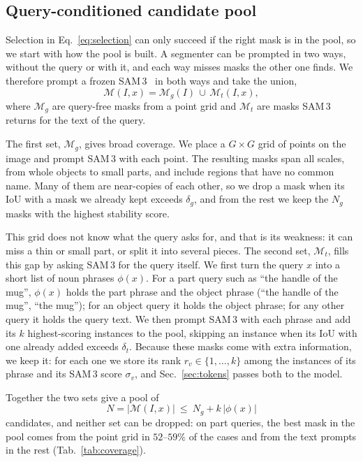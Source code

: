 \subsection{Query-conditioned candidate pool}
\label{sec:pool}

Selection in Eq.~\eqref{eq:selection} can only succeed if the right mask is in the pool, so we start with how the
pool is built. A segmenter can be prompted in two ways, without the query or with it, and each way misses masks the
other one finds. We therefore prompt a frozen SAM\,3~\cite{sam3} in both ways and take the union,
\begin{equation}
  \mathcal{M}(I,x)=\mathcal{M}_{g}(I)\,\cup\,\mathcal{M}_{t}(I,x),
  \label{eq:pool}
\end{equation}
where $\mathcal{M}_g$ are query-free masks from a point grid and $\mathcal{M}_t$ are masks SAM\,3 returns for the
text of the query.

The first set, $\mathcal{M}_g$, gives broad coverage. We place a $G\times G$ grid of points on the image and prompt
SAM\,3 with each point. The resulting masks span all scales, from whole objects to small parts, and include regions
that have no common name. Many of them are near-copies of each other, so we drop a mask when its IoU with a mask we
already kept exceeds $\delta_g$, and from the rest we keep the $N_g$ masks with the highest stability score.

This grid does not know what the query asks for, and that is its weakness: it can miss a thin or small part, or
split it into several pieces. The second set, $\mathcal{M}_t$, fills this gap by asking SAM\,3 for the query
itself. We first turn the query $x$ into a short list of noun phrases $\phi(x)$. For a part query such as ``the
handle of the mug'', $\phi(x)$ holds the part phrase and the object phrase (``the handle of the mug'', ``the
mug''); for an object query it holds the object phrase; for any other query it holds the query text. We then
prompt SAM\,3 with each phrase and add its $k$ highest-scoring instances to the pool, skipping an instance when
its IoU with one already added exceeds $\delta_t$. Because these masks come with extra information, we keep it:
for each one we store its rank $r_v\in\{1,\dots,k\}$ among the instances of its phrase and its SAM\,3 score
$\sigma_v$, and Sec.~\ref{sec:tokens} passes both to the model.

Together the two sets give a pool of
\begin{equation}
  N=|\mathcal{M}(I,x)|\ \le\ N_g+k\,|\phi(x)|
\end{equation}
candidates, and neither set can be dropped: on part queries, the best mask in the pool comes from the point grid in
$52$--$59\%$ of the cases and from the text prompts in the rest (Tab.~\ref{tab:coverage}).

